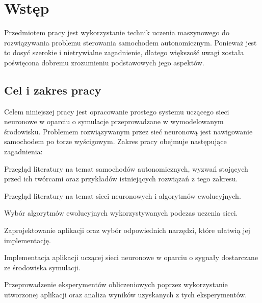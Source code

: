 \chapter*{Wstęp}
Przedmiotem pracy jest wykorzystanie technik uczenia maszynowego do rozwiązywania problemu sterowania samochodem autonomicznym. Ponieważ jest to dosyć szerokie i nietrywialne zagadnienie, dlatego większość uwagi została poświęcona dobremu zrozumieniu podstawowych jego aspektów.

\vspace{1.5cm}
\section*{Cel i zakres pracy}
Celem niniejszej pracy jest opracowanie prostego systemu uczącego sieci neuronowe w oparciu o symulacje przeprowadzane w wymodelowanym środowisku.   Problemem rozwiązywanym przez sieć neuronową jest nawigowanie samochodem po torze wyścigowym. Zakres pracy obejmuje następujące zagadnienia:
\begin{enumerate*}
\item Przegląd literatury na temat samochodów autonomicznych, wyzwań stojących przed ich twórcami oraz przykładów istniejących rozwiązań z tego zakresu.
\item Przegląd literatury na temat sieci neuronowych i algorytmów ewolucyjnych.
\item Wybór algorytmów ewolucyjnych wykorzystywanych podczas uczenia sieci.
\item Zaprojektowanie aplikacji oraz wybór odpowiednich narzędzi, które ułatwią jej implementację.
\item Implementacja aplikacji uczącej sieci neuronowe w oparciu o sygnały dostarczane ze środowiska symulacji.
\item Przeprowadzenie eksperymentów obliczeniowych poprzez wykorzystanie utworzonej aplikacji oraz analiza wyników uzyskanych z tych eksperymentów.
\end{enumerate*}

\newpage
